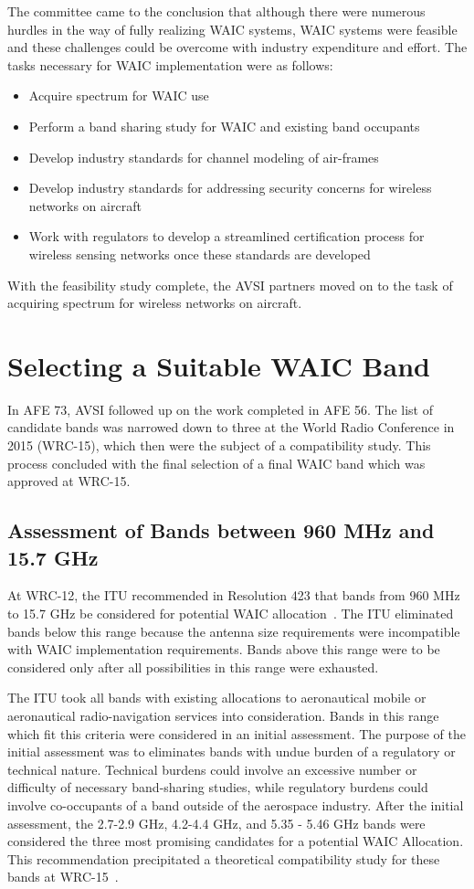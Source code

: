 The committee came to the conclusion that although there were numerous hurdles in the way of fully realizing WAIC systems, WAIC systems were feasible and these challenges could be overcome with industry expenditure and effort. The tasks necessary for WAIC implementation were as follows: 
\begin{itemize}
\item Acquire spectrum for WAIC use
\item Perform a band sharing study for WAIC and existing band occupants
\item Develop industry standards for channel modeling of air-frames
\item Develop industry standards for addressing security concerns for wireless networks on aircraft
\item Work with regulators to develop a streamlined certification process for wireless sensing networks once these standards are developed
\end{itemize}
 
With the feasibility study complete, the AVSI partners moved on to the task of acquiring spectrum for wireless networks on aircraft. 
 
\section{Selecting a Suitable WAIC Band}
In AFE 73, AVSI followed up on the work completed in AFE 56. The list of candidate bands was narrowed down to three at the World Radio Conference in 2015 (WRC-15), which then were the subject of a compatibility study. This process concluded with the final selection of a final WAIC band which was approved at WRC-15.
\subsection{Assessment of Bands between 960 MHz and 15.7 GHz}
At WRC-12, the ITU recommended in Resolution 423 that bands from 960 MHz to 15.7 GHz be considered for potential WAIC allocation~\cite{noauthor_consideration_2014}. The ITU eliminated bands below this range because the antenna size requirements were incompatible with WAIC implementation requirements. Bands above this range were to be considered only after all possibilities in this range were exhausted. 

The ITU took all bands with existing allocations to aeronautical mobile or aeronautical radio-navigation services into consideration. Bands in this range which fit this criteria were considered in an initial assessment. The purpose of the initial assessment was to eliminates bands with undue burden of a regulatory or technical nature. Technical burdens could involve an excessive number or difficulty of necessary band-sharing studies, while regulatory burdens could involve co-occupants of a band outside of the aerospace industry. After the initial assessment, the 2.7-2.9 GHz, 4.2-4.4 GHz, and 5.35 - 5.46 GHz bands were considered the three most promising candidates for a potential WAIC Allocation. This recommendation precipitated a theoretical compatibility study for these bands at WRC-15~\cite{noauthor_consideration_2014}.  

